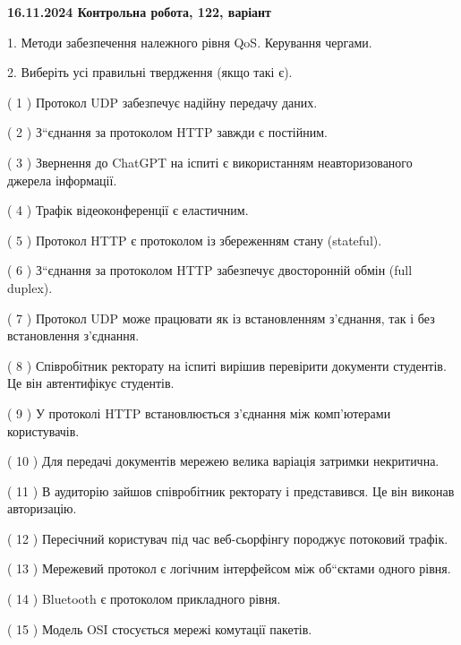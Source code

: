 \documentclass[12pt, ukrainian]{article}
\begin{document}
\vspace{4mm}
\newpage
\begin {large}

\textbf{16.11.2024 Контрольна робота, 122, варіант  }\par


{
1. Методи забезпечення належного рівня QoS. Керування чергами.



\vspace{5mm}
2. Виберіть усі правильні твердження (якщо такі є).\par
\vspace{2mm}

( 1 ) Протокол UDP забезпечує надійну передачу даних.

( 2 ) З“єднання за протоколом  HTTP завжди є постійним.

( 3 ) Звернення до ChatGPT на іспиті є використанням неавторизованого джерела інформації.

( 4 ) Трафік відеоконференції є еластичним.

( 5 ) Протокол  HTTP є протоколом із збереженням стану (stateful).

( 6 ) З“єднання за протоколом  HTTP забезпечує двосторонній обмін (full duplex).

( 7 ) Протокол UDP може працювати як із встановленням з'єднання, так і без встановлення з'єднання.

( 8 ) Співробітник ректорату на іспиті вирішив перевірити документи студентів. Це він автентифікує студентів.

( 9 ) У протоколі HTTP встановлюється з'єднання між комп'ютерами користувачів.

( 10 ) Для передачі документів мережею велика варіація затримки некритична.

( 11 ) В аудиторію зайшов співробітник ректорату і представився. Це він виконав авторизацію.

( 12 ) Пересічний користувач під час веб-сьорфінгу породжує потоковий трафік.

( 13 ) Мережевий протокол є логічним інтерфейсом між об“єктами одного рівня.

( 14 ) Bluetooth є протоколом прикладного рівня.

( 15 ) Модель OSI стосується мережі комутації пакетів.
}
\end {large}
\end{document}
